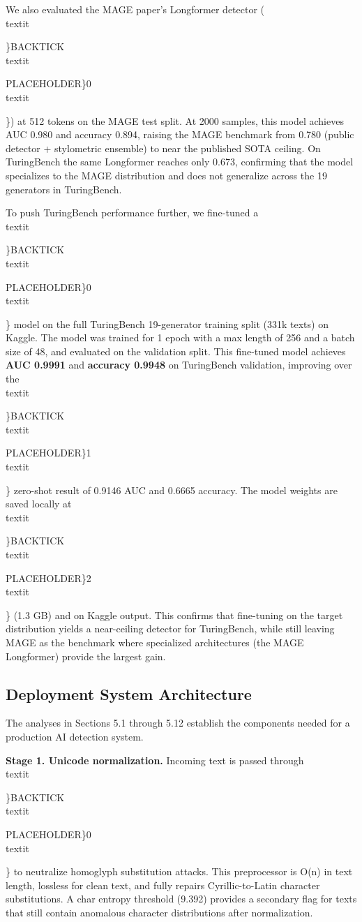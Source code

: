 \documentclass{article}
\begin{document}
{{{{{{{{{{{{We also evaluated the MAGE paper's Longformer detector (\\textit{\}BACKTICK\\textit{PLACEHOLDER\}0\\textit{\}) at 512 tokens on the MAGE test split. At 2000 samples, this model achieves AUC 0.980 and accuracy 0.894, raising the MAGE benchmark from 0.780 (public detector + stylometric ensemble) to near the published SOTA ceiling. On TuringBench the same Longformer reaches only 0.673, confirming that the model specializes to the MAGE distribution and does not generalize across the 19 generators in TuringBench.

To push TuringBench performance further, we fine-tuned a \\textit{\}BACKTICK\\textit{PLACEHOLDER\}0\\textit{\} model on the full TuringBench 19-generator training split (331k texts) on Kaggle. The model was trained for 1 epoch with a max length of 256 and a batch size of 48, and evaluated on the validation split. This fine-tuned model achieves \textbf{AUC 0.9991} and \textbf{accuracy 0.9948} on TuringBench validation, improving over the \\textit{\}BACKTICK\\textit{PLACEHOLDER\}1\\textit{\} zero-shot result of 0.9146 AUC and 0.6665 accuracy. The model weights are saved locally at \\textit{\}BACKTICK\\textit{PLACEHOLDER\}2\\textit{\} (1.3 GB) and on Kaggle output. This confirms that fine-tuning on the target distribution yields a near-ceiling detector for TuringBench, while still leaving MAGE as the benchmark where specialized architectures (the MAGE Longformer) provide the largest gain.

\subsection{Deployment System Architecture}

The analyses in Sections 5.1 through 5.12 establish the components needed for a production AI detection system.

\textbf{Stage 1. Unicode normalization.} Incoming text is passed through \\textit{\}BACKTICK\\textit{PLACEHOLDER\}0\\textit{\} to neutralize homoglyph substitution attacks. This preprocessor is O(n) in text length, lossless for clean text, and fully repairs Cyrillic-to-Latin character substitutions. A char entropy threshold (9.392) provides a secondary flag for texts that still contain anomalous character distributions after normalization.

}}}}}}}}}}}}}}}}}}}}}}}}}}}
\end{document}
